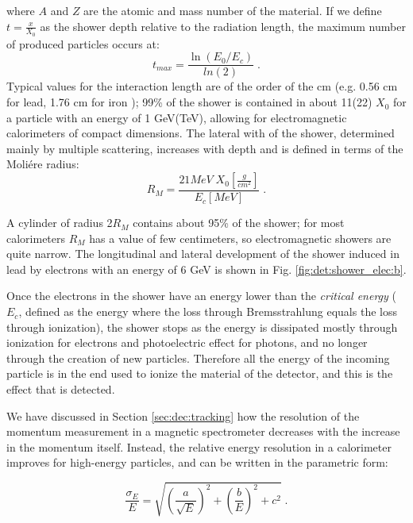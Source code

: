 \noindent where $A$ and $Z$ are the atomic and mass number of the material. If we define $t = \frac{x}{X_0}$ as the shower depth relative to the radiation length, the maximum number of produced particles occurs at:
\begin{equation}
t_{max} = \frac{\ln\left(E_0/E_c\right)}{ln\left(2\right)} \;.
\end{equation}
Typical values for the interaction length are of the order of the cm (e.g. 0.56 cm for lead, 1.76 cm for iron \cite{Patrignani:2016xqp}); 99\% of the shower is contained in about 11(22) $X_0$ for a particle with an energy of 1 GeV(TeV), 
allowing for electromagnetic calorimeters of compact dimensions. 
The lateral with of the shower, determined mainly by multiple scattering, increases with depth and is defined in terms of the Moli\'ere radius:
\begin{equation}
R_M = \frac{21 MeV \; X_0[\frac{g}{cm^2}]}{E_c [MeV]} \; .
\end{equation}

\noindent A cylinder of radius 2$R_M$ contains about 95\% of the shower; for most calorimeters $R_M$ has a value of few centimeters, so electromagnetic showers are quite narrow. The longitudinal and lateral development of the shower induced in lead by electrons with an energy of 6 GeV is shown in Fig. \ref{fig:det:shower_elec:b}.

Once the electrons in the shower have an energy lower than the \textit{critical energy} 
($E_c$, defined as the energy where the loss through Bremsstrahlung equals the loss through ionization), 
the shower stops as the energy is dissipated mostly through ionization for electrons and photoelectric effect for photons, 
and no longer through the creation of new particles. 
Therefore all the energy of the incoming particle is in the end used to ionize the material of the detector, and this is the effect that is detected.


We have discussed in Section \ref{sec:dec:tracking} how the resolution of the momentum measurement in a magnetic spectrometer decreases with the increase in the momentum itself. Instead, the relative energy resolution in a calorimeter improves for high-energy particles, and can be written in the parametric form:

\begin{equation}
\frac{\sigma_E}{E} = \sqrt{\left(\frac{a}{\sqrt{E}} \right)^2 + \left( \frac{b}{E} \right)^2 + c^2 } \; .
\end{equation}

